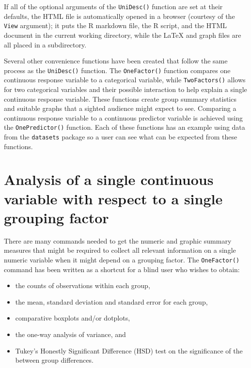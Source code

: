 \documentclass[
]{book}
\providecommand{\tightlist}{%
  \setlength{\itemsep}{0pt}\setlength{\parskip}{0pt}}
\begin{document}
If all of the optional arguments of the \texttt{UniDesc()} function are set at their defaults, the HTML file is automatically opened in a browser (courtesy of the \texttt{View} argument); it puts the R markdown file, the R script, and the HTML document in the current working directory, while the LaTeX and graph files are all placed in a subdirectory.

Several other convenience functions have been created that follow the same process as the \texttt{UniDesc()} function. The \texttt{OneFactor()} function compares one continuous response variable to a categorical variable, while \texttt{TwoFactors()} allows for two categorical variables and their possible interaction to help explain a single continuous response variable. These functions create group summary statistics and suitable graphs that a sighted audience might expect to see. Comparing a continuous response variable to a continuous predictor variable is achieved using the \texttt{OnePredictor()} function. Each of these functions has an example using data from the \texttt{datasets} package \citep{Rpkg-base} so a user can see what can be expected from these functions.

\hypertarget{analysis-of-a-single-continuous-variable-with-respect-to-a-single-grouping-factor}{%
\section{Analysis of a single continuous variable with respect to a single grouping factor}\label{analysis-of-a-single-continuous-variable-with-respect-to-a-single-grouping-factor}}

There are many commands needed to get the numeric and graphic summary measures that might be required to collect all relevant information on a single numeric variable when it might depend on a grouping factor. The \texttt{OneFactor()} command has been written as a shortcut for a blind user who wishes to obtain:

\begin{itemize}
\tightlist
\item
  the counts of observations within each group,
\item
  the mean, standard deviation and standard error for each group,
\item
  comparative boxplots and/or dotplots,
\item
  the one-way analysis of variance, and
\item
  Tukey's Honestly Significant Difference (HSD) test on the significance of the between group differences.
\end{itemize}
\end{document}
